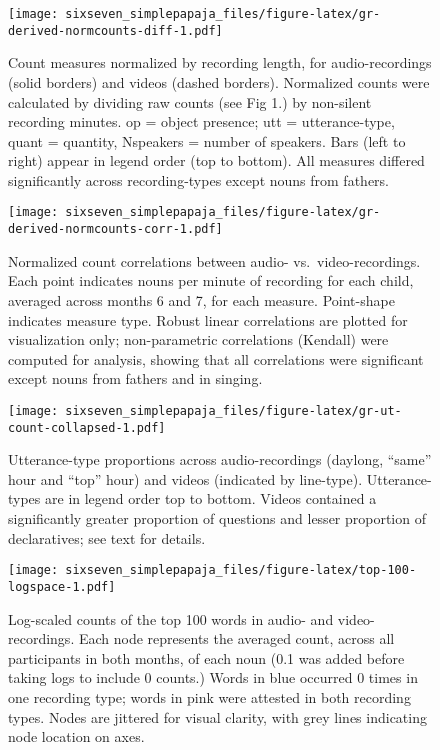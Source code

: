 \documentclass[man]{apa6}
\theoremstyle{definition}
\theoremstyle{definition}
\theoremstyle{definition}
\theoremstyle{remark}
\begin{document}
\begin{figure}
\centering
\texttt{[image: sixseven\_simplepapaja\_files/figure-latex/gr-derived-normcounts-diff-1.pdf]}
\caption{\label{fig:gr-derived-normcounts-diff}Count measures normalized by
recording length, for audio-recordings (solid borders) and videos
(dashed borders). Normalized counts were calculated by dividing raw
counts (see Fig 1.) by non-silent recording minutes. op = object
presence; utt = utterance-type, quant = quantity, Nspeakers = number of
speakers. Bars (left to right) appear in legend order (top to bottom).
All measures differed significantly across recording-types except nouns
from fathers.}
\end{figure}

\begin{figure}
\centering
\texttt{[image: sixseven\_simplepapaja\_files/figure-latex/gr-derived-normcounts-corr-1.pdf]}
\caption{\label{fig:gr-derived-normcounts-corr}Normalized count correlations
between audio- vs.~video-recordings. Each point indicates nouns per
minute of recording for each child, averaged across months 6 and 7, for
each measure. Point-shape indicates measure type. Robust linear
correlations are plotted for visualization only; non-parametric
correlations (Kendall) were computed for analysis, showing that all
correlations were significant except nouns from fathers and in singing.}
\end{figure}

\begin{figure}
\centering
\texttt{[image: sixseven\_simplepapaja\_files/figure-latex/gr-ut-count-collapsed-1.pdf]}
\caption{\label{fig:gr-ut-count-collapsed}Utterance-type proportions across
audio-recordings (daylong, \enquote{same} hour and \enquote{top} hour)
and videos (indicated by line-type). Utterance-types are in legend order
top to bottom. Videos contained a significantly greater proportion of
questions and lesser proportion of declaratives; see text for details.}
\end{figure}

\begin{figure}
\centering
\texttt{[image: sixseven\_simplepapaja\_files/figure-latex/top-100-logspace-1.pdf]}
\caption{\label{fig:top-100-logspace}Log-scaled counts of the top 100 words
in audio- and video-recordings. Each node represents the averaged count,
across all participants in both months, of each noun (0.1 was added
before taking logs to include 0 counts.) Words in blue occurred 0 times
in one recording type; words in pink were attested in both recording
types. Nodes are jittered for visual clarity, with grey lines indicating
node location on axes.}
\end{figure}
\end{document}
